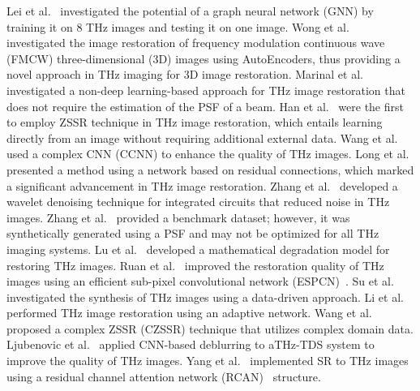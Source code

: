 Lei et al.~\cite{leiTerahertzTimedomainSuperresolution2021} investigated the potential of a graph neural network (GNN) by training it on 8 THz images and testing it on one image.
Wong et al.~\cite{wongTrainingAutoencoderbasedOptimizers2019} investigated the image restoration of frequency modulation continuous wave (FMCW) three-dimensional (3D) images using AutoEncoders, thus providing a novel approach in THz imaging for 3D image restoration.
Marinal et al.~\cite{marinaljubenovicJointDeblurringDenoising2020} investigated a non-deep learning-based approach for THz image restoration that does not require the estimation of the PSF of a beam.
Han et al.~\cite{hanTerahertzImageRestoration2020} were the first to employ ZSSR technique in THz image restoration, which entails  learning directly from an image without requiring additional external data.
Wang et al.~\cite{wangTerahertzImageSuperresolution2021} used a complex CNN (CCNN) to enhance the quality of THz images.
Long et al.~\cite{longTerahertzImageSuperresolution2019} presented a method using a network based on residual connections, which marked a significant advancement in THz image restoration.
Zhang et al.~\cite{zhangRestorationIntegratedCircuit2021} developed a wavelet denoising technique for integrated circuits that reduced noise in THz images.
Zhang et al.~\cite{zhangTerahertzImageRestoration2022} provided a benchmark dataset; however, it was synthetically generated using a PSF and may not be optimized for all THz imaging systems.
Lu et al.~\cite{luMathematicalDegradationModel2021a} developed a mathematical degradation model for restoring THz images.
Ruan et al.~\cite{ruanEfficientSubpixelConvolutional2022} improved the restoration quality of THz images using an efficient sub-pixel convolutional network (ESPCN)~\cite{shi2016real}.
Su et al.~\cite{suDataDrivenBasedTerahertzImage2023} investigated the synthesis of THz images using a data-driven approach.
Li et al.~\cite{liAdaptiveTerahertzImage2020} performed THz image restoration using an adaptive network.
Wang et al.~\cite{wangComplexZeroshotSuperresolution2022} proposed a complex ZSSR (CZSSR) technique that utilizes complex domain data.
Ljubenovic et al.~\cite{ljubenovicCNNbasedDeblurringTerahertz2020} applied CNN-based deblurring to aTHz-TDS system to improve the quality of THz images.
Yang et al.~\cite{yangSuperresolutionReconstructionTerahertz2022} implemented SR to THz images using a residual channel attention network (RCAN)~\cite{zhang2018image} structure.

